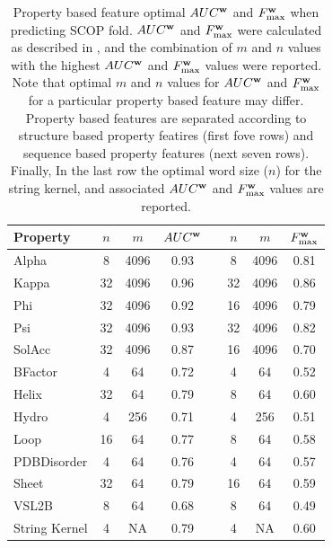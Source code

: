 \begin{table}[h]



\centering
	\begin{tabular}{|l|ccc|c|ccc|}
	\hline
		Property & $n$ & $m$ & $AUC^{\bf{w}}$ &  & $n$ & $m$ & $F^{\bf{w}}_{\max}$\\
		\hline
		Alpha & 8 & 4096 & 0.93 &  & 8 & 4096 & 0.81\\
		Kappa & 32 & 4096 & 0.96 &  & 32 & 4096 & 0.86\\
		Phi & 32 & 4096 & 0.92 &  & 16 & 4096 & 0.79\\
		Psi & 32 & 4096 & 0.93 &  & 32 & 4096 & 0.82\\
		SolAcc & 32 & 4096 & 0.87 &  & 16 & 4096 & 0.70\\
		\hline
		BFactor & 4 & 64 & 0.72 &  & 4 & 64 & 0.52\\
		Helix & 32 & 64 & 0.79 &  & 8 & 64 & 0.60\\
		Hydro & 4 & 256 & 0.71 &  & 4 & 256 & 0.51\\
		Loop & 16 & 64 & 0.77 &  & 8 & 64 & 0.58\\
		PDBDisorder & 4 & 64 & 0.76 &  & 4 & 64 & 0.57\\
		Sheet & 32 & 64 & 0.79 &  & 16 & 64 & 0.59\\
		VSL2B & 8 & 64 & 0.68 &  & 8 & 64 & 0.49\\
		\hline
		String Kernel & 4 & NA & 0.79 &  & 4 & NA & 0.60\\
		\hline
	\end{tabular}
 
					



 \caption[SCOP fold property based feature optimal  $AUC^{\bf{w}}$ and $F^{\bf{w}}_{\max}$]{Property based feature optimal  $AUC^{\bf{w}}$ and $F^{\bf{w}}_{\max}$ when predicting SCOP fold.  $AUC^{\bf{w}}$ and $F^{\bf{w}}_{\max}$ were calculated as described in , and the combination of $m$ and $n$ values with the highest  $AUC^{\bf{w}}$ and $F^{\bf{w}}_{\max}$ values were reported. Note that optimal $m$ and $n$ values for $AUC^{\bf{w}}$ and $F^{\bf{w}}_{\max}$ for a particular property based feature may differ.  Property based features are separated according to structure based property featires (first fove rows) and sequence based property features (next seven rows).  Finally, In the last row the optimal word size ($n$) for the string kernel, and associated $AUC^{\bf{w}}$ and $F^{\bf{w}}_{\max}$ values are reported. }
\label{tab:vqscopstandardperformance}
\end{table}


